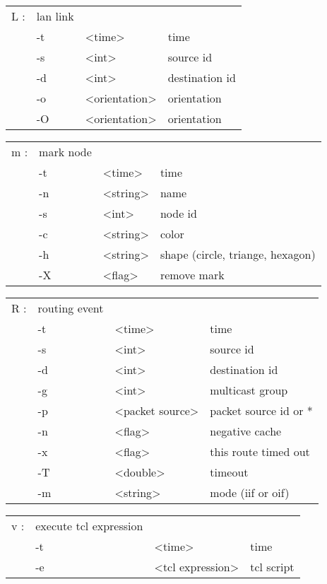   \begin{tabular}{llll}
  L : & lan link & & \\
    &  -t & <time> & time \\
    &  -s & <int> & source id \\
    &  -d & <int> & destination id \\
    &  -o & <orientation> & orientation \\
    &  -O & <orientation> & orientation \\
  \end{tabular}

  \begin{tabular}{llll}
  m : & mark node & & \\
    &  -t & <time> & time \\
    &  -n & <string> & name \\
    &  -s & <int> & node id \\
    &  -c & <string> & color \\
    &  -h & <string> & shape (circle, triange, hexagon) \\
    &  -X & <flag> & remove mark \\
  \end{tabular}

  \begin{tabular}{llll}
  R : & routing event & & \\
    &  -t & <time> & time \\
    &  -s & <int> & source id \\
    &  -d & <int> & destination id \\
    &  -g & <int> & multicast group \\
    &  -p & <packet source> & packet source id or * \\
    &  -n & <flag> & negative cache \\
    &  -x & <flag> & this route timed out \\
    &  -T & <double> & timeout \\
    &  -m & <string> & mode (iif or oif) \\
  \end{tabular}

  \begin{tabular}{llll}
  v : & execute tcl expression & & \\
    &  -t & <time> & time \\
    &  -e & <tcl expression> & tcl script \\
  \end{tabular}

